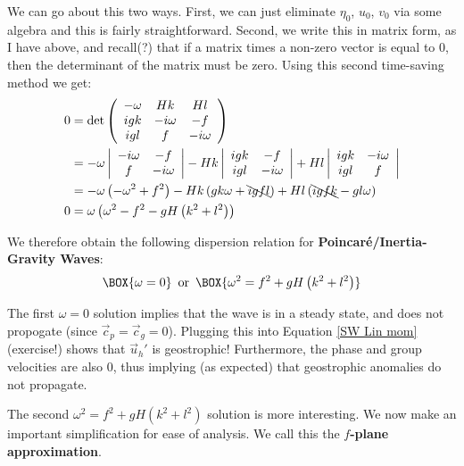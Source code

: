 We can go about this two ways. First, we can just eliminate \(\eta_0\), \(u_0\), \(v_0\) via some algebra and this is fairly straightforward. Second, we write this in matrix form, as I have above, and recall(?) that if a matrix times a non-zero vector is equal to 0, then the determinant of the matrix must be zero. Using this second time-saving method we get:
\begin{align*}
   0 &=\det\left( \begin{array}{ccc}
        -\omega & Hk & Hl \\
        igk & -i\omega & -f\\
        igl & f & -i\omega
    \end{array} \right)
   \\
   &=-\omega \left|\begin{array}{cc}
        -i\omega & -f\\
        f & -i\omega
    \end{array} \right|
    -Hk \left|\begin{array}{cc}
        igk & -f\\
        igl & -i\omega
    \end{array} \right|
    +Hl \left|\begin{array}{cc}
        igk & -i\omega\\
        igl & f
    \end{array} \right|
    \\
    &=-\omega\left( -\omega^2+f^2 \right)
    -Hk \left( gk\omega +\bcancel{igfl} \right)
    +Hl \left( \bcancel{igfk} -gl\omega \right)
    \\
    0&=\omega\left( \omega^2 - f^2 - gH \left( k^2+l^2 \right) \right)
\end{align*}

We therefore obtain the following dispersion relation for \textbf{Poincaré/Inertia-Gravity Waves}:
\begin{align}
    \BOX{\omega=0}\,\text{ or }\,\BOX{\omega^2 = f^2 + gH \left( k^2 + l^2 \right)}
\end{align}

The first \(\omega=0\) solution implies that the wave is in a steady state, and does not propogate (since \(\vec{c}_p=\vec{c}_g=0\)). Plugging this into Equation \ref{SW Lin mom} (exercise!) shows that \(\vec{u}_h'\) is geostrophic! Furthermore, the phase and group velocities are also \(0\), thus implying (as expected) that geostrophic anomalies do not propagate. 

The second \(\omega^2=f^2+gH\left( k^2+l^2 \right)\) solution is more interesting. We now make an important simplification for ease of analysis. We call this the \textbf{\(f\)-plane approximation}.

